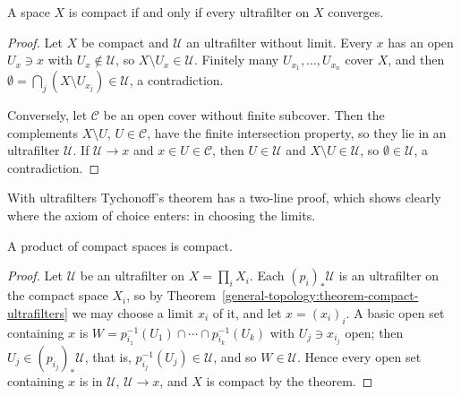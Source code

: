 \begin{theorem}\label{general-topology:theorem-compact-ultrafilters}
A space $X$ is compact if and only if every ultrafilter on $X$ converges.
\end{theorem}

\begin{proof}
Let $X$ be compact and $\mathcal{U}$ an ultrafilter without limit. Every $x$ has an open $U_x \ni x$ with $U_x \notin \mathcal{U}$, so $X \setminus U_x \in \mathcal{U}$. Finitely many $U_{x_1}, \ldots, U_{x_n}$
cover $X$, and then $\emptyset = \bigcap_j(X \setminus U_{x_j}) \in \mathcal{U}$, a contradiction.

Conversely, let $\mathcal{C}$ be an open cover without finite subcover. Then the complements $X \setminus U$, $U \in \mathcal{C}$, have the finite intersection property, so they lie in an ultrafilter
$\mathcal{U}$. If $\mathcal{U} \to x$ and $x \in U \in \mathcal{C}$, then $U \in \mathcal{U}$ and $X \setminus U \in \mathcal{U}$, so $\emptyset \in \mathcal{U}$, a contradiction.
\end{proof}

With ultrafilters Tychonoff's theorem has a two-line proof, which shows clearly where the axiom of choice enters: in choosing the limits.

\begin{corollary}\label{general-topology:corollary-tychonoff-ultrafilters}
A product of compact spaces is compact.
\end{corollary}

\begin{proof}
Let $\mathcal{U}$ be an ultrafilter on $X = \prod_iX_i$. Each $(p_i)_*\mathcal{U}$ is an ultrafilter on the compact space $X_i$, so by Theorem~\ref{general-topology:theorem-compact-ultrafilters} we may choose a limit
$x_i$ of it, and let $x = (x_i)_i$. A basic open set containing $x$ is $W = p_{i_1}^{-1}(U_1) \cap \cdots \cap p_{i_k}^{-1}(U_k)$ with $U_j \ni x_{i_j}$ open; then $U_j \in (p_{i_j})_*\mathcal{U}$, that is,
$p_{i_j}^{-1}(U_j) \in \mathcal{U}$, and so $W \in \mathcal{U}$. Hence every open set containing $x$ is in $\mathcal{U}$, $\mathcal{U} \to x$, and $X$ is compact by the theorem.
\end{proof}


